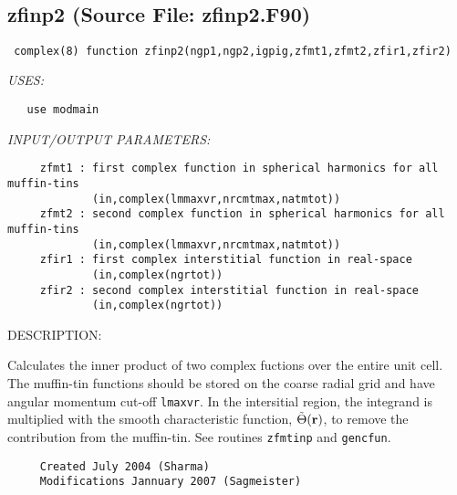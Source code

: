 \documentclass[11pt]{article}
\begin{document}





 
 
\mbox{}\hrulefill\ 
 
\subsection{zfinp2 (Source File: zfinp2.F90)}


\begin{verbatim} complex(8) function zfinp2(ngp1,ngp2,igpig,zfmt1,zfmt2,zfir1,zfir2)\end{verbatim}{\em USES:}
\begin{verbatim}   use modmain\end{verbatim}{\em INPUT/OUTPUT PARAMETERS:}
\begin{verbatim}     zfmt1 : first complex function in spherical harmonics for all muffin-tins
             (in,complex(lmmaxvr,nrcmtmax,natmtot))
     zfmt2 : second complex function in spherical harmonics for all muffin-tins
             (in,complex(lmmaxvr,nrcmtmax,natmtot))
     zfir1 : first complex interstitial function in real-space
             (in,complex(ngrtot))
     zfir2 : second complex interstitial function in real-space
             (in,complex(ngrtot))\end{verbatim}
{\sf DESCRIPTION:\\ }


     Calculates the inner product of two complex fuctions over the entire unit
     cell. The muffin-tin functions should be stored on the coarse radial grid
     and have angular momentum cut-off {\tt lmaxvr}. In the intersitial region,
     the integrand is multiplied with the smooth characteristic function,
     $\tilde{\Theta}({\bf r})$, to remove the contribution from the muffin-tin.
     See routines {\tt zfmtinp} and {\tt gencfun}.
  
\begin{verbatim}     Created July 2004 (Sharma)
     Modifications Jannuary 2007 (Sagmeister)\end{verbatim}

\end{document}
